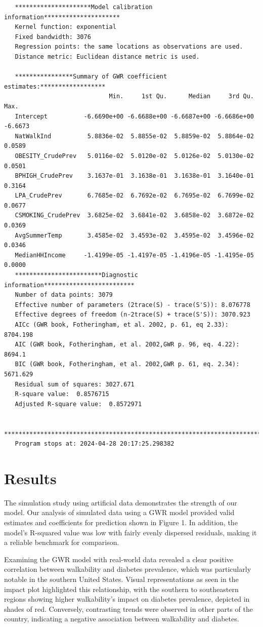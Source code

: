 \documentclass[
]{article}
\begin{document}
\begin{verbatim}
   *********************Model calibration information*********************
   Kernel function: exponential 
   Fixed bandwidth: 3076 
   Regression points: the same locations as observations are used.
   Distance metric: Euclidean distance metric is used.

   ****************Summary of GWR coefficient estimates:******************
                             Min.     1st Qu.      Median     3rd Qu.    Max.
   Intercept          -6.6690e+00 -6.6688e+00 -6.6687e+00 -6.6686e+00 -6.6673
   NatWalkInd          5.8836e-02  5.8855e-02  5.8859e-02  5.8864e-02  0.0589
   OBESITY_CrudePrev   5.0116e-02  5.0120e-02  5.0126e-02  5.0130e-02  0.0501
   BPHIGH_CrudePrev    3.1637e-01  3.1638e-01  3.1638e-01  3.1640e-01  0.3164
   LPA_CrudePrev       6.7685e-02  6.7692e-02  6.7695e-02  6.7699e-02  0.0677
   CSMOKING_CrudePrev  3.6825e-02  3.6841e-02  3.6858e-02  3.6872e-02  0.0369
   AvgSummerTemp       3.4585e-02  3.4593e-02  3.4595e-02  3.4596e-02  0.0346
   MedianHHIncome     -1.4199e-05 -1.4197e-05 -1.4196e-05 -1.4195e-05  0.0000
   ************************Diagnostic information*************************
   Number of data points: 3079 
   Effective number of parameters (2trace(S) - trace(S'S)): 8.076778 
   Effective degrees of freedom (n-2trace(S) + trace(S'S)): 3070.923 
   AICc (GWR book, Fotheringham, et al. 2002, p. 61, eq 2.33): 8704.198 
   AIC (GWR book, Fotheringham, et al. 2002,GWR p. 96, eq. 4.22): 8694.1 
   BIC (GWR book, Fotheringham, et al. 2002,GWR p. 61, eq. 2.34): 5671.629 
   Residual sum of squares: 3027.671 
   R-square value:  0.8576715 
   Adjusted R-square value:  0.8572971 

   ***********************************************************************
   Program stops at: 2024-04-28 20:17:25.298382 
\end{verbatim}

\section{Results}\label{results}

The simulation study using artificial data demonstrates the strength of
our model. Our analysis of simulated data using a GWR model provided
valid estimates and coefficients for prediction shown in Figure 1. In
addition, the model's R-squared value was low with fairly evenly
dispersed residuals, making it a reliable benchmark for comparison.

Examining the GWR model with real-world data revealed a clear positive
correlation between walkability and diabetes prevalence, which was
particularly notable in the southern United States. Visual
representations as seen in the impact plot highlighted this
relationship, with the southern to southeastern regions showing higher
walkability's impact on diabetes prevalence, depicted in shades of red.
Conversely, contrasting trends were observed in other parts of the
country, indicating a negative association between walkability and
diabetes.
\end{document}
